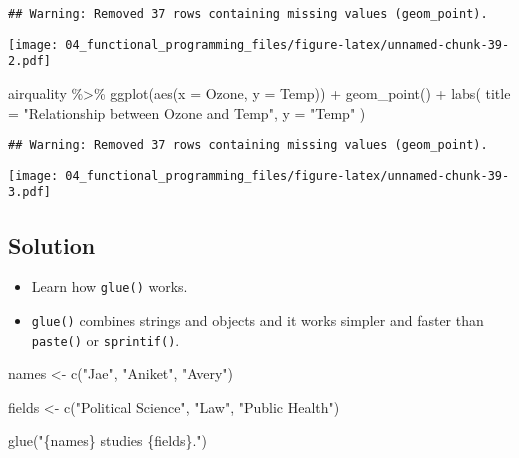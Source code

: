 \documentclass[
]{book}
\newenvironment{Shaded}{\begin{snugshade}}{\end{snugshade}}
\newcommand{\AttributeTok}[1]{\textcolor[rgb]{0.77,0.63,0.00}{#1}}
\newcommand{\FunctionTok}[1]{\textcolor[rgb]{0.00,0.00,0.00}{#1}}
\newcommand{\NormalTok}[1]{#1}
\newcommand{\OtherTok}[1]{\textcolor[rgb]{0.56,0.35,0.01}{#1}}
\newcommand{\SpecialCharTok}[1]{\textcolor[rgb]{0.00,0.00,0.00}{#1}}
\newcommand{\StringTok}[1]{\textcolor[rgb]{0.31,0.60,0.02}{#1}}
\begin{document}
\begin{verbatim}
## Warning: Removed 37 rows containing missing values (geom_point).
\end{verbatim}

\texttt{[image: 04\_functional\_programming\_files/figure-latex/unnamed-chunk-39-2.pdf]}

\begin{Shaded}
\begin{Highlighting}[]
\NormalTok{airquality }\SpecialCharTok{\%\textgreater{}\%}
  \FunctionTok{ggplot}\NormalTok{(}\FunctionTok{aes}\NormalTok{(}\AttributeTok{x =}\NormalTok{ Ozone, }\AttributeTok{y =}\NormalTok{ Temp)) }\SpecialCharTok{+}
  \FunctionTok{geom\_point}\NormalTok{() }\SpecialCharTok{+}
  \FunctionTok{labs}\NormalTok{(}
    \AttributeTok{title =} \StringTok{"Relationship between Ozone and Temp"}\NormalTok{,}
    \AttributeTok{y =} \StringTok{"Temp"}
\NormalTok{  )}
\end{Highlighting}
\end{Shaded}

\begin{verbatim}
## Warning: Removed 37 rows containing missing values (geom_point).
\end{verbatim}

\texttt{[image: 04\_functional\_programming\_files/figure-latex/unnamed-chunk-39-3.pdf]}

\hypertarget{solution}{%
\subsection{Solution}\label{solution}}

\begin{itemize}
\item
  Learn how \texttt{glue()} works.
\item
  \texttt{glue()} combines strings and objects and it works simpler and faster than \texttt{paste()} or \texttt{sprintif()}.
\end{itemize}

\begin{Shaded}
\begin{Highlighting}[]
\NormalTok{names }\OtherTok{\textless{}{-}} \FunctionTok{c}\NormalTok{(}\StringTok{"Jae"}\NormalTok{, }\StringTok{"Aniket"}\NormalTok{, }\StringTok{"Avery"}\NormalTok{)}

\NormalTok{fields }\OtherTok{\textless{}{-}} \FunctionTok{c}\NormalTok{(}\StringTok{"Political Science"}\NormalTok{, }\StringTok{"Law"}\NormalTok{, }\StringTok{"Public Health"}\NormalTok{)}

\FunctionTok{glue}\NormalTok{(}\StringTok{"\{names\} studies \{fields\}."}\NormalTok{)}
\end{Highlighting}
\end{Shaded}
\end{document}

